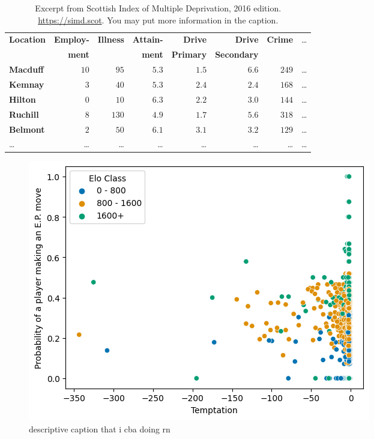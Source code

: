 \documentclass[10pt,a4paper,twocolumn]{article}
\begin{document}
\begin{table}[b]
  \centering
  \caption{Excerpt from Scottish Index of Multiple Deprivation, 2016 edition.
    \url{https://simd.scot}. You may put more information in the caption.}
  \label{tab:example1}
\begin{tabular}{lrrrrrrr}
\hline\hline
\textbf{Location}&\textbf{Employ-}&\textbf{Illness}&\textbf{Attain-}&\textbf{Drive}  &\textbf{Drive}    &\textbf{Crime}&\dots\\
                 &\textbf{ment}   &                &\textbf{ment}   &\textbf{Primary}&\textbf{Secondary}&              &\\
\hline
\textbf{Macduff}&$10$&$ 95$&$5.3$&$1.5$&$6.6$&$249$&\dots\tabularnewline
\textbf{Kemnay}&$ 3$&$ 40$&$5.3$&$2.4$&$2.4$&$168$&\dots\tabularnewline
\textbf{Hilton}&$ 0$&$ 10$&$6.3$&$2.2$&$3.0$&$144$&\dots\tabularnewline
\textbf{Ruchill}&$ 8$&$130$&$4.9$&$1.7$&$5.6$&$318$&\dots\tabularnewline
\textbf{Belmont}&$ 2$&$ 50$&$6.1$&$3.1$&$3.2$&$129$&\dots\tabularnewline
\dots&\dots&\dots&\dots&\dots&\dots&\dots&\dots\tabularnewline
\hline
\end{tabular}
\end{table}


\begin{figure}[t]
  \centering
  \includegraphics{report/images/temptation_chart.png}
  \caption{descriptive caption that i cba doing rn}
  \label{fds-project-template:fig:temptation}
\end{figure}
\end{document}
